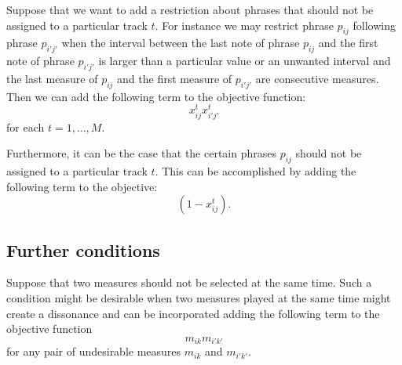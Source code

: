 \documentclass[11pt,a4paper]{article}
\begin{document}
 Suppose that we want to add a restriction about phrases that should not be assigned to a particular track $ t $. For instance we may restrict phrase $ p_{ij} $ following phrase $ p_{i'j'} $ when the interval between the last note of phrase $ p_{ij} $ and the first note of phrase $p_{i'j'} $ is larger than a particular value or an unwanted interval and the last measure of $ p_{ij} $ and the first measure of $ p_{i'j'} $ are consecutive measures. Then we can add the following term to the objective function:
 \begin{equation}
 x_{ij}^tx_{i'j'}^t
 \end{equation} 
 for each $ t=1,\dots,M $.
 
 Furthermore, it can be the case that the certain phrases $ p_{ij} $ should not be assigned to a particular track $ t $. This can be accomplished by adding the following term to the objective:
 \begin{equation}
 (1-x_{ij}^t).
 \end{equation} 
 
 \subsection{Further conditions}
 Suppose that two measures should not be selected at the same time. Such a condition might be desirable when two measures played at the same time might create a dissonance and can be incorporated adding the following term to the objective function
 \begin{equation}
 m_{ik}m_{i'k'}
 \end{equation}  
for any pair of undesirable measures $m_{ik}$ and $ m_{i'k'} $. 



\end{document}
